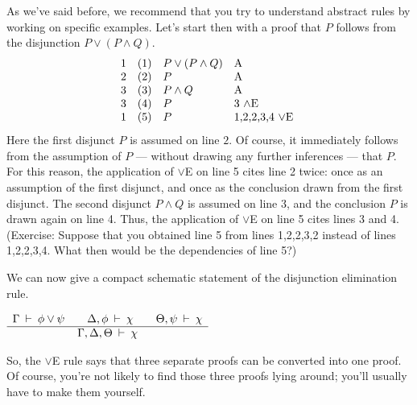 As we've said before, we recommend that you try to understand abstract
rules by working on specific examples.  Let's start then with a proof
that $P$ follows from the disjunction $P\vee (P\wedge Q)$.
\[ \begin{array}{l l l p{2cm}}
    1 & (1) & P\vee (P\wedge Q) & A \\
    2 & (2) & P          & A \\
    3 & (3) & P\wedge Q  & A \\
    3 & (4) & P          & 3 $\wedge$E \\
    1 & (5) & P & 1,2,2,3,4
    $\vee$E \end{array} \] Here the first disjunct $P$ is assumed on
line $2$.  Of course, it immediately follows from the assumption of
$P$ --- without drawing any further inferences --- that $P$.  For this
reason, the application of $\vee$E on line 5 cites line 2 twice: once
as an assumption of the first disjunct, and once as the conclusion
drawn from the first disjunct.  The second disjunct $P\wedge Q$ is
assumed on line 3, and the conclusion $P$ is drawn again on line 4.
Thus, the application of $\vee$E on line 5 cites lines 3 and 4.
(Exercise: Suppose that you obtained line 5 from lines 1,2,2,3,2
instead of lines 1,2,2,3,4.  What then would be the dependencies of
line 5?)

We can now give a compact schematic statement of the disjunction
elimination rule.
\bigskip \begin{tcolorbox}[enhanced,width=7cm,title=disjunction
  elimination ($\vee$E),attach boxed title to top
  left={yshift=-2mm,xshift=4mm},boxed title style={sharp corners}]
  $ \begin{array}{c c c} \Gamma\:\vdash\: \phi \vee \psi \qquad
    \Delta ,\phi\:\vdash\:\chi \qquad \Theta ,\psi\:\vdash\:\chi \\
    \hline \Gamma ,\Delta ,\Theta\:\vdash\:\chi \end{array} $
\end{tcolorbox}
\bigskip \noindent So, the $\vee$E rule says that three separate
proofs can be converted into one proof.  Of course, you're not likely
to find those three proofs lying around; you'll usually have to make
them yourself. 

